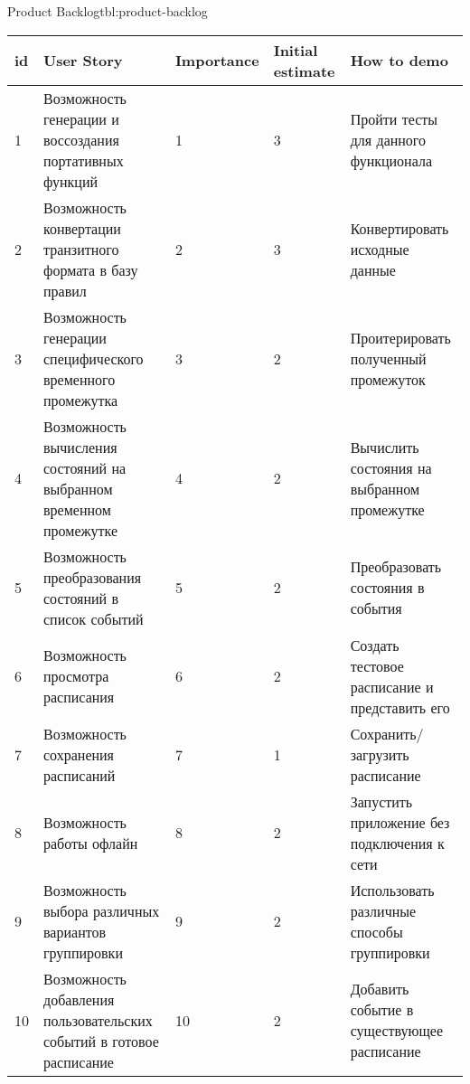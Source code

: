 \begin{tbl}{Product Backlog}{tbl:product-backlog}
  \begin{tabularx}{\textwidth}{| p{0.5cm} | p{4.5cm} | p{2cm} | p{1.5cm} | X |}
  \hline id & User Story                                                           & Importance & Initial estimate & How to demo \\
  \hline 1  & Возможность генерации и воссоздания портативных функций              & 1          & 3                & Пройти тесты для данного функционала \\
  \hline 2  & Возможность конвертации транзитного формата в базу правил            & 2          & 3                & Конвертировать исходные данные \\
  \hline 3  & Возможность генерации специфического временного промежутка           & 3          & 2                & Проитерировать полученный промежуток \\
  \hline 4  & Возможность вычисления состояний на выбранном временном промежутке   & 4          & 2                & Вычислить состояния на выбранном промежутке \\
  \hline 5  & Возможность преобразования состояний в список событий                & 5          & 2                & Преобразовать состояния в события \\
  \hline 6  & Возможность просмотра расписания                                     & 6          & 2                & Создать тестовое расписание и представить его \\
  \hline 7  & Возможность сохранения расписаний                                    & 7          & 1                & Сохранить/загрузить расписание \\
  \hline 8  & Возможность работы офлайн                                            & 8          & 2                & Запустить приложение без подключения к сети \\
  \hline 9  & Возможность выбора различных вариантов группировки                   & 9          & 2                & Использовать различные способы группировки \\
  \hline 10 & Возможность добавления пользовательских событий в готовое расписание & 10         & 2                & Добавить событие в существующее расписание \\
  \hline
  \end{tabularx}
\end{tbl}

\clearpage